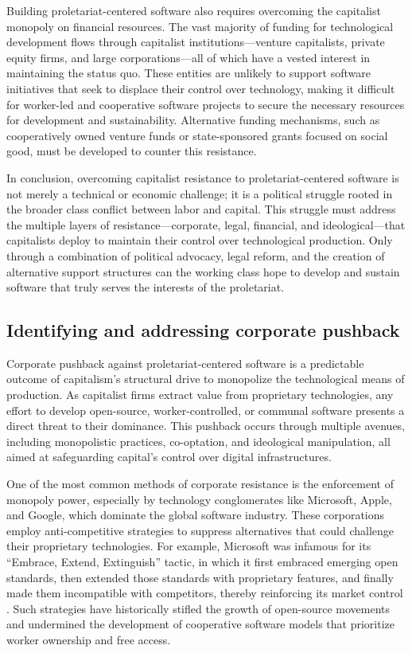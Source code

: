 \begin{refsection}
Building proletariat-centered software also requires overcoming the capitalist monopoly on financial resources. The vast majority of funding for technological development flows through capitalist institutions—venture capitalists, private equity firms, and large corporations—all of which have a vested interest in maintaining the status quo. These entities are unlikely to support software initiatives that seek to displace their control over technology, making it difficult for worker-led and cooperative software projects to secure the necessary resources for development and sustainability. Alternative funding mechanisms, such as cooperatively owned venture funds or state-sponsored grants focused on social good, must be developed to counter this resistance.

In conclusion, overcoming capitalist resistance to proletariat-centered software is not merely a technical or economic challenge; it is a political struggle rooted in the broader class conflict between labor and capital. This struggle must address the multiple layers of resistance—corporate, legal, financial, and ideological—that capitalists deploy to maintain their control over technological production. Only through a combination of political advocacy, legal reform, and the creation of alternative support structures can the working class hope to develop and sustain software that truly serves the interests of the proletariat.

\subsection{Identifying and addressing corporate pushback}

Corporate pushback against proletariat-centered software is a predictable outcome of capitalism’s structural drive to monopolize the technological means of production. As capitalist firms extract value from proprietary technologies, any effort to develop open-source, worker-controlled, or communal software presents a direct threat to their dominance. This pushback occurs through multiple avenues, including monopolistic practices, co-optation, and ideological manipulation, all aimed at safeguarding capital’s control over digital infrastructures.

One of the most common methods of corporate resistance is the enforcement of monopoly power, especially by technology conglomerates like Microsoft, Apple, and Google, which dominate the global software industry. These corporations employ anti-competitive strategies to suppress alternatives that could challenge their proprietary technologies. For example, Microsoft was infamous for its “Embrace, Extend, Extinguish” tactic, in which it first embraced emerging open standards, then extended those standards with proprietary features, and finally made them incompatible with competitors, thereby reinforcing its market control \cite[pp.~211]{moody_rebel_code}. Such strategies have historically stifled the growth of open-source movements and undermined the development of cooperative software models that prioritize worker ownership and free access.


\end{refsection}
